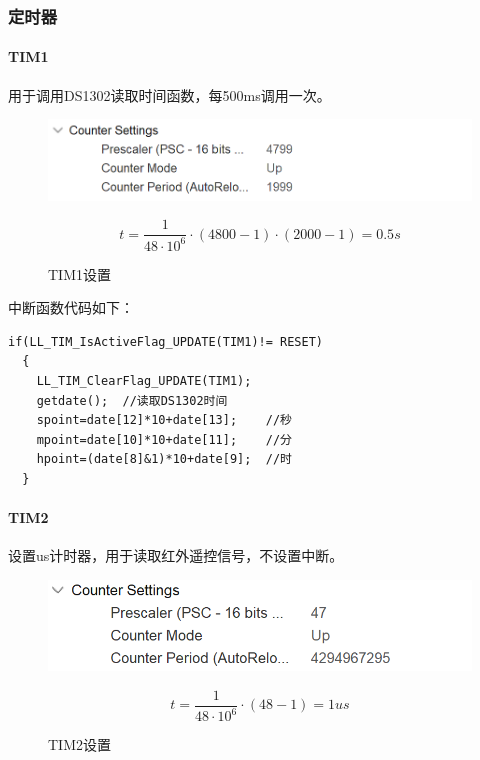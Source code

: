 \documentclass{article}
\begin{document}
\subsubsection{定时器}
\paragraph{TIM1}用于调用DS1302读取时间函数，每500ms调用一次。\par
\begin{figure}[H]
\begin{minipage}{0.5\textwidth}
    \centering
    \includegraphics[width=0.9\linewidth]{assets/8.png}
    \caption{TIM1设置}
\end{minipage}
\begin{minipage}{0.49\textwidth}
    $$
    t=\frac1{48\cdot10^6}\cdot(4800-1)\cdot (2000-1)=0.5s
    $$
\end{minipage}
\end{figure}
中断函数代码如下：\par
\begin{multicols}{2}
\begin{lstlisting}
if(LL_TIM_IsActiveFlag_UPDATE(TIM1)!= RESET)
  {
    LL_TIM_ClearFlag_UPDATE(TIM1);
    getdate();  //读取DS1302时间
    spoint=date[12]*10+date[13];    //秒
    mpoint=date[10]*10+date[11];    //分
    hpoint=(date[8]&1)*10+date[9];  //时
  }
\end{lstlisting}
\end{multicols}
\paragraph{TIM2}设置us计时器，用于读取红外遥控信号，不设置中断。
\begin{figure}[H]
    \begin{minipage}{0.5\textwidth}
        \centering
        \includegraphics[width=0.9\linewidth]{assets/9.png}
        \caption{TIM2设置}
    \end{minipage}
    \begin{minipage}{0.49\textwidth}
        $$
        t=\frac1{48\cdot10^6}\cdot(48-1)=1us
        $$
    \end{minipage}
    \end{figure}
\end{document}
